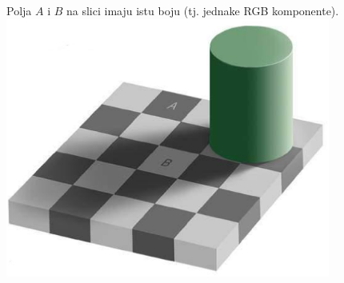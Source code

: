 \documentclass{article}
\begin{document}
Polja $A$ i $B$ na slici imaju istu boju (tj. jednake {\sc RGB}
komponente).
\includegraphics[width=0.8\textwidth]{pr_pok_3.eps}
\end{document}
